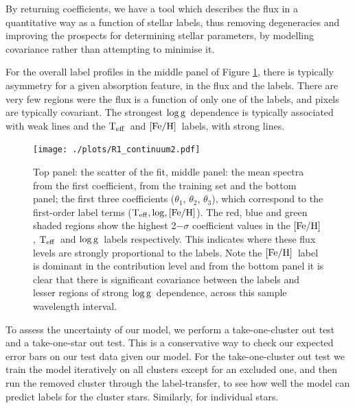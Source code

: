 \documentclass[12pt, preprint]{aastex}
\newcommand{\teff}{\mbox{$\rm T_{eff}$}}
\newcommand{\feh}{\mbox{$\rm [Fe/H]$}}
\newcommand{\logg}{\mbox{$\rm \log g$}}
\begin{document}
By returning coefficients, we have a tool which describes the flux in a quantitative way as a function of stellar labels, thus removing degeneracies and improving the prospects for determining stellar parameters, by modelling covariance rather than attempting to minimise it. 

For the overall label profiles in the middle panel of Figure \ref{fig:coeffs}, there is typically asymmetry for a given absorption feature, in the flux and the labels. There are very few regions were the flux is a function of only one of the labels, and pixels are typically covariant. The strongest \logg\ dependence is typically associated with weak lines and the \teff\ and \feh\ labels, with strong lines. 

 
\begin{figure}[h!]
\centering
    \texttt{[image: ./plots/R1\_continuum2.pdf]}
  \caption{Top panel: the scatter of the fit, middle panel: the mean spectra from the first coefficient, from the training set and the bottom panel; the first three coefficients ($\theta_1$, $\theta_2$, $\theta_3$),  which correspond to the first-order label terms ($\teff, \log, \feh$).   The red, blue and green shaded regions show the highest 2$-\sigma$ coefficient values in the \feh, \teff\ and \logg\ labels respectively. This indicates where these flux levels are strongly proportional to the labels. Note the \feh\ label is dominant in the contribution level and from the bottom panel it is clear that there is significant covariance between the labels and lesser regions of strong \logg\ dependence, across this sample wavelength interval.}
\label{fig:coeffs}
\end{figure}

To assess the uncertainty of our model, we perform a take-one-cluster out test and a take-one-star out test. This is a conservative way to check our expected error bars on our test data given our model. For the take-one-cluster out test we train the model iteratively on all clusters except for an excluded one, and then run the removed cluster through the label-transfer, to see how well the model can predict labels for the cluster stars. Similarly, for individual stars.  
\end{document}
